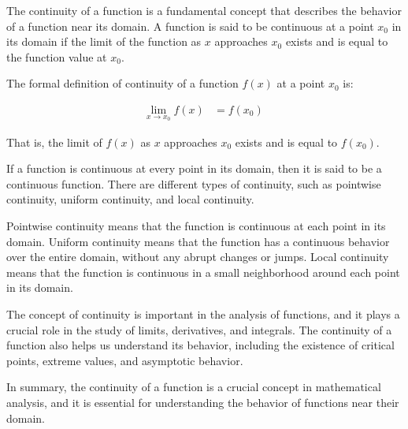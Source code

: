 \documentclass[12pt,openany]{book}
\theoremstyle{definition}
\begin{document}
	
	The continuity of a function is a fundamental concept that describes the behavior of a function near its domain. A function is said to be continuous at a point $x_0$ in its domain if the limit of the function as $x$ approaches $x_0$ exists and is equal to the function value at $x_0$.
	
	The formal definition of continuity of a function $f(x)$ at a point $x_0$ is:
	
	\begin{align*}
	\lim_{x \to x_0}f(x) &= f(x_0)\
	\end{align*}
	
	That is, the limit of $f(x)$ as $x$ approaches $x_0$ exists and is equal to $f(x_0)$.
	
	If a function is continuous at every point in its domain, then it is said to be a continuous function. There are different types of continuity, such as pointwise continuity, uniform continuity, and local continuity.
	
	Pointwise continuity means that the function is continuous at each point in its domain. Uniform continuity means that the function has a continuous behavior over the entire domain, without any abrupt changes or jumps. Local continuity means that the function is continuous in a small neighborhood around each point in its domain.
	
	The concept of continuity is important in the analysis of functions, and it plays a crucial role in the study of limits, derivatives, and integrals. The continuity of a function also helps us understand its behavior, including the existence of critical points, extreme values, and asymptotic behavior.
	
	In summary, the continuity of a function is a crucial concept in mathematical analysis, and it is essential for understanding the behavior of functions near their domain.
	
	\newpage
\end{document}

